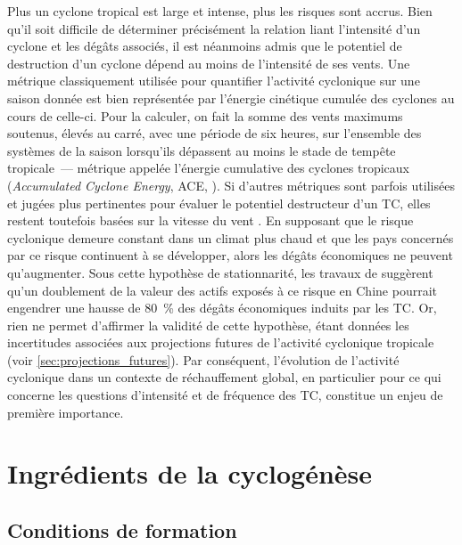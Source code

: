 \documentclass[../main.tex]{subfiles}
\begin{document}
Plus un cyclone tropical est large et intense, plus les risques sont accrus. Bien qu'il soit difficile de déterminer précisément la relation liant l'intensité
d'un cyclone et les dégâts associés, il est néanmoins admis que le potentiel de destruction d'un cyclone dépend au moins de l'intensité de ses vents. Une
métrique classiquement utilisée pour quantifier l'activité cyclonique sur une saison donnée est bien représentée par l'énergie cinétique cumulée des cyclones au
cours de celle-ci. Pour la calculer, on fait la somme des vents maximums soutenus, élevés au carré, avec une période de six heures, sur l'ensemble des systèmes
de la saison lorsqu'ils dépassent au moins le stade de tempête tropicale~--- métrique appelée l'énergie cumulative des cyclones tropicaux (\textit{Accumulated
Cyclone Energy}, ACE, \cite{bell_climate_2000}). Si d'autres métriques sont parfois utilisées et jugées plus pertinentes pour évaluer le potentiel destructeur
d'un TC, elles restent toutefois basées sur la vitesse du vent \parencite{powell_tropical_2007}. En supposant que le risque cyclonique demeure constant
dans un climat plus chaud et que les pays concernés par ce risque continuent à se développer, alors les dégâts économiques ne peuvent qu'augmenter. Sous cette
hypothèse de stationnarité, les travaux de \cite{ye_dependence_2020} suggèrent qu'un doublement de la valeur des actifs exposés à ce risque en Chine pourrait
engendrer une hausse de \SI{80}{\percent} des dégâts économiques induits par les TC. Or, rien ne permet d'affirmer la validité de cette hypothèse, étant données
les incertitudes associées aux projections futures de l'activité cyclonique tropicale (voir \cref{sec:projections_futures}). Par conséquent, l'évolution de
l'activité cyclonique dans un contexte de réchauffement global, en particulier pour ce qui concerne les questions d'intensité et de fréquence des TC, constitue
un enjeu de première importance.

\section{Ingrédients de la cyclogénèse}
  
\subsection{Conditions de formation}\label{sec:conditions_cyclogenese}
\end{document}
